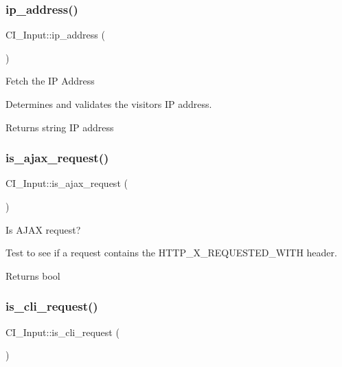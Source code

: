 \subsubsection{\texorpdfstring{ip\+\_\+address()}{ip\_address()}}
{\footnotesize\ttfamily C\+I\+\_\+\+Input\+::ip\+\_\+address (\begin{DoxyParamCaption}{ }\end{DoxyParamCaption})}

Fetch the IP Address

Determines and validates the visitor\textquotesingle{}s IP address.

\begin{DoxyReturn}{Returns}
string IP address 
\end{DoxyReturn}
\mbox{\label{class_c_i___input_a4c2e808b93a8ed814782278a24a1da38}} 
\subsubsection{\texorpdfstring{is\+\_\+ajax\+\_\+request()}{is\_ajax\_request()}}
{\footnotesize\ttfamily C\+I\+\_\+\+Input\+::is\+\_\+ajax\+\_\+request (\begin{DoxyParamCaption}{ }\end{DoxyParamCaption})}

Is A\+J\+AX request?

Test to see if a request contains the H\+T\+T\+P\+\_\+\+X\+\_\+\+R\+E\+Q\+U\+E\+S\+T\+E\+D\+\_\+\+W\+I\+TH header.

\begin{DoxyReturn}{Returns}
bool 
\end{DoxyReturn}
\mbox{\label{class_c_i___input_ac062ed0f4198fb4dd0946be2d2e3bb88}} 
\subsubsection{\texorpdfstring{is\+\_\+cli\+\_\+request()}{is\_cli\_request()}}
{\footnotesize\ttfamily C\+I\+\_\+\+Input\+::is\+\_\+cli\+\_\+request (\begin{DoxyParamCaption}{ }\end{DoxyParamCaption})}

